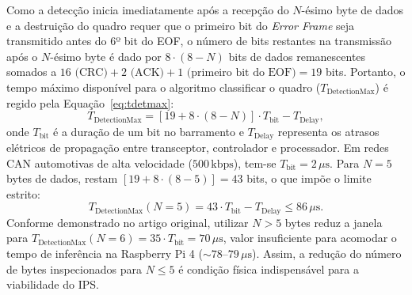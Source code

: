 \documentclass[conference]{IEEEtran}
\begin{document}
Como a detecção inicia imediatamente após a recepção do $N$-ésimo byte de dados e a destruição do quadro requer que o primeiro bit do \textit{Error Frame} seja transmitido antes do 6º bit do EOF, o número de bits restantes na transmissão após o $N$-ésimo byte é dado por $8 \cdot (8 - N)$ bits de dados remanescentes somados a $16 \text{ (CRC)} + 2 \text{ (ACK)} + 1 \text{ (primeiro bit do EOF)} = 19$ bits. Portanto, o tempo máximo disponível para o algoritmo classificar o quadro ($T_{\text{DetectionMax}}$) é regido pela Equação~\eqref{eq:tdetmax}:
\begin{equation}
T_{\text{DetectionMax}} = \left[19 + 8 \cdot (8 - N)\right] \cdot T_{\text{bit}} - T_{\text{Delay}},
\label{eq:tdetmax}
\end{equation}
onde $T_{\text{bit}}$ é a duração de um bit no barramento e $T_{\text{Delay}}$ representa os atrasos elétricos de propagação entre transceptor, controlador e processador. Em redes CAN automotivas de alta velocidade ($500\,\text{kbps}$), tem-se $T_{\text{bit}} = 2\,\mu\text{s}$. Para $N = 5$ bytes de dados, restam $[19 + 8 \cdot (8 - 5)] = 43$ bits, o que impõe o limite estrito:
\begin{equation}
T_{\text{DetectionMax}}(N=5) = 43 \cdot T_{\text{bit}} - T_{\text{Delay}} \le 86\,\mu\text{s}.
\label{eq:limit86}
\end{equation}
Conforme demonstrado no artigo original, utilizar $N > 5$ bytes reduz a janela para $T_{\text{DetectionMax}}(N=6) = 35 \cdot T_{\text{bit}} = 70\,\mu\text{s}$, valor insuficiente para acomodar o tempo de inferência na Raspberry Pi 4 ($\sim 78\text{--}79\,\mu\text{s}$). Assim, a redução do número de bytes inspecionados para $N \le 5$ é condição física indispensável para a viabilidade do IPS.
\end{document}
